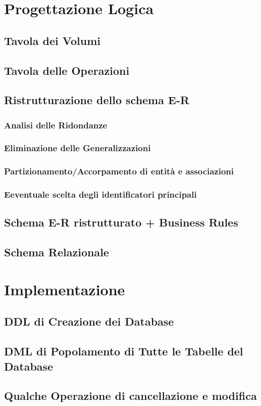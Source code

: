 \documentclass[letterpaper]{report}
\begin{document}
\chapter{Progettazione Logica}
\section{Tavola dei Volumi}
\section{Tavola delle Operazioni}
\section{Ristrutturazione dello schema E-R}
\subsection{Analisi delle Ridondanze}
\subsection{Eliminazione delle Generalizzazioni}
\subsection{Partizionamento/Accorpamento di entità e associazioni}
\subsection{Eeventuale scelta degli identificatori principali}
\section{Schema E-R ristrutturato + Business Rules}
\section{Schema Relazionale}

\chapter{Implementazione}
\section{DDL di Creazione dei Database}
\section{DML di Popolamento di Tutte le Tabelle del Database}
\section{Qualche Operazione di cancellazione e modifica}
\end{document}
